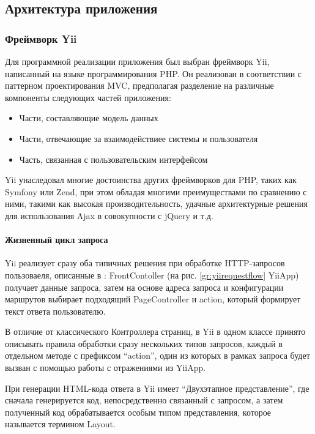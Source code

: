 \subsection{Архитектура приложения}


\subsubsection{Фреймворк Yii}
\label{section:yii}
Для программной реализации приложения был выбран фреймворк Yii\cite{yii}, написанный на языке
программирования PHP. Он реализован в соответствии с паттерном проектирования MVC\cite{gamma},
предполагая разделение на различные компоненты следующих частей приложения:
\begin{itemize}
\item{
Части, составляющие модель данных
}
\item{
Части, отвечающие за взаимодействиее системы и пользователя
}
\item{ 
Часть, связанная с пользовательским интерфейсом
}
\end{itemize}

Yii унаследовал многие достоинства других фреймворков для PHP, таких как Symfony или Zend, 
при этом обладая многими преимуществами по сравнению с ними, такими как высокая производительность,
удачные архитектурные решения для использования Ajax в совокупности с jQuery и т.д.

\paragraph{Жизненный цикл запроса}
Yii реализует сразу оба типичных решения при обработке HTTP-запросов пользоваеля, описанные в \cite{fowler}:
FrontContoller (на рис. \ref{gr:yiirequestflow} YiiApp) получает данные запроса, затем на основе
адреса запроса и конфигурации маршрутов выбирает подходящий PageController и action, который формирует текст ответа пользователю.

В отличие от классического Контроллера страниц, в Yii в одном классе принято описывать правила обработки сразу нескольких
типов запросов, каждый в отдельном методе с префиксом ``action'', один из которых в рамках запроса будет вызван
с помощью работы с отражениями из YiiApp.

При генерации HTML-кода ответа в Yii имеет ``Двухэтапное представление'', где сначала
генерируется код, непосредственно связанный с запросом, а затем полученный код обрабатывается
особым типом представления, которое называется термином Layout.  

